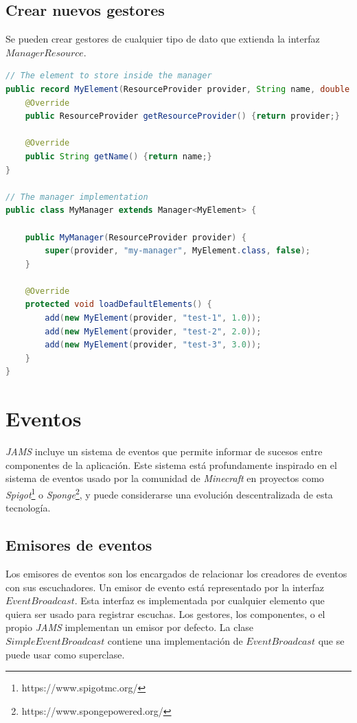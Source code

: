 \subsection{Crear nuevos gestores}\label{subsec:crear-nuevos-gestores}

Se pueden crear gestores de cualquier tipo de dato que extienda la interfaz $ManagerResource$.

\begin{lstlisting}[language=Java,style=java,frame=single,label={lst:crear-nuevos-gestores}]
// The element to store inside the manager
public record MyElement(ResourceProvider provider, String name, double value) implements ManagerResource {
    @Override
    public ResourceProvider getResourceProvider() {return provider;}

    @Override
    public String getName() {return name;}
}

// The manager implementation
public class MyManager extends Manager<MyElement> {

    public MyManager(ResourceProvider provider) {
        super(provider, "my-manager", MyElement.class, false);
    }

    @Override
    protected void loadDefaultElements() {
        add(new MyElement(provider, "test-1", 1.0));
        add(new MyElement(provider, "test-2", 2.0));
        add(new MyElement(provider, "test-3", 3.0));
    }
}
\end{lstlisting}


\section{Eventos}\label{sec:eventos}

\textit{JAMS} incluye un sistema de eventos que permite informar de sucesos entre componentes de la aplicación.
Este sistema está profundamente inspirado en el sistema de eventos usado por la comunidad de \textit{Minecraft}
en proyectos como \textit{Spigot}\footnote{https://www.spigotmc.org/}
o \textit{Sponge}\footnote{https://www.spongepowered.org/}, y puede considerarse una evolución descentralizada
de esta tecnología.

\subsection{Emisores de eventos}\label{subsec:emisores-de-eventos}

Los emisores de eventos son los encargados de relacionar los creadores de eventos con sus escuchadores.
Un emisor de evento está representado por la interfaz $EventBroadcast$.
Esta interfaz es implementada por cualquier elemento que quiera ser usado para registrar escuchas.
Los gestores, los componentes, o el propio \textit{JAMS} implementan un emisor por defecto.
La clase $SimpleEventBroadcast$ contiene una implementación de $EventBroadcast$
que se puede usar como superclase.


